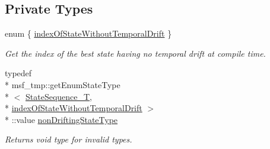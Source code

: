 \subsection*{Private Types}
\begin{DoxyCompactItemize}
\item 
enum \{ \hyperlink{classmsf__core_1_1MSF__Core_a97cd21e5127e09c53545d64df0b7035fad2798ed0416110329db910b456f60f2c}{index\-Of\-State\-Without\-Temporal\-Drift}
 \}
\begin{DoxyCompactList}\small\item\em Get the index of the best state having no temporal drift at compile time. \end{DoxyCompactList}\item 
typedef \\*
msf\-\_\-tmp\-::get\-Enum\-State\-Type\\*
$<$ \hyperlink{classmsf__core_1_1MSF__Core_af8de96f8f0a8677c79c12563f86b26d3}{State\-Sequence\-\_\-\-T}, \\*
\hyperlink{classmsf__core_1_1MSF__Core_a97cd21e5127e09c53545d64df0b7035fad2798ed0416110329db910b456f60f2c}{index\-Of\-State\-Without\-Temporal\-Drift} $>$\\*
\-::value \hyperlink{classmsf__core_1_1MSF__Core_aca5d903b57559980415221fa95f5f32b}{non\-Drifting\-State\-Type}
\begin{DoxyCompactList}\small\item\em Returns void type for invalid types. \end{DoxyCompactList}\end{DoxyCompactItemize}
